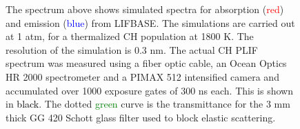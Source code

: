 \begin{figure}

\centering



\caption[CH PLIF Spectrum]{The spectrum above shows simulated spectra for absorption (\textcolor{red}{red}) and emission (\textcolor{blue}{blue}) from LIFBASE. The simulations are carried out at 1 atm, for a thermalized CH population at 1800 K. The resolution of the simulation is 0.3 nm. The actual CH PLIF spectrum was measured using a fiber optic cable, an Ocean Optics HR 2000 spectrometer and a PIMAX 512 intensified camera and accumulated over 1000 exposure gates of 300 ns each. This is shown in \textcolor{black}{black}. The dotted \textcolor{green}{green} curve is the transmittance for the 3 mm thick GG 420 Schott glass filter used to block elastic scattering.}

\label{fig:chPLIFSpectrum}

\end{figure}

